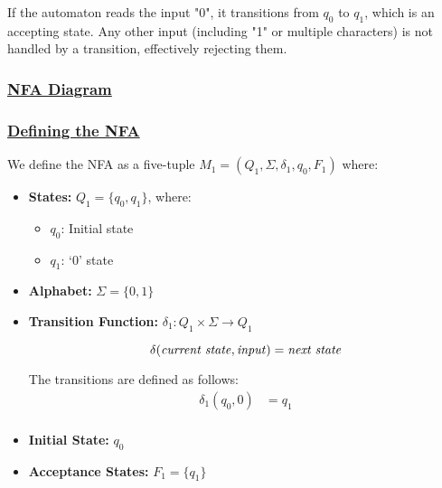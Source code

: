 \documentclass[12pt]{article}
\begin{document}
	If the automaton reads the input "0", it transitions from $q_0$ to $q_1$, which is an accepting state. Any other input (including "1" or multiple characters) is not handled by a transition, effectively rejecting them.
	\subsubsection*{\underline{NFA Diagram}}
	\begin{center}
	\end{center}
	
	\subsubsection*{\underline{Defining the NFA}}
	We define the NFA as a five-tuple \(M_1 = (Q_1, \Sigma, \delta_1, q_0, F_1)\) where:
	\begin{itemize}[leftmargin=*]
		\item \textbf{States:} \(Q_1 = \{q_0, q_1\}\), where:
		\begin{itemize}
			\item \(q_0\): Initial state
			\item \(q_1\): `0' state
		\end{itemize}
		\item \textbf{Alphabet:} \(\Sigma = \{0, 1\}\)
		
		\item \textbf{Transition Function:} \(\delta_1: Q_1 \times \Sigma \to Q_1\)
		
		\begin{mdframed}[linewidth=1pt, leftmargin=3cm, rightmargin=3.2cm]
			\[\delta(\text{\textit{current state}}, \text{\textit{input}}) = \text{\textit{next state}}\]
		\end{mdframed}
		
		The transitions are defined as follows:
		\begin{align*}
			\delta_1(q_0, 0) &= q_1 \\
		\end{align*}
		
		\item \textbf{Initial State:} \(q_0\)
		
		\item \textbf{Acceptance States:} \(F_1 = \{q_1\}\)
	\end{itemize}
	
\end{document}
